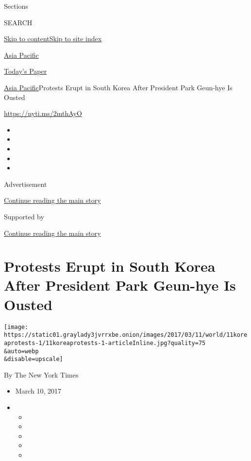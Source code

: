 Sections

SEARCH

\protect\hyperlink{site-content}{Skip to
content}\protect\hyperlink{site-index}{Skip to site index}

\href{https://www.nytimes3xbfgragh.onion/section/world/asia}{Asia
Pacific}

\href{https://myaccount.nytimes3xbfgragh.onion/auth/login?response_type=cookie\&client_id=vi}{}

\href{https://www.nytimes3xbfgragh.onion/section/todayspaper}{Today's
Paper}

\href{/section/world/asia}{Asia Pacific}\textbar{}Protests Erupt in
South Korea After President Park Geun-hye Is Ousted

\url{https://nyti.ms/2mthAyO}

\begin{itemize}
\item
\item
\item
\item
\item
\end{itemize}

Advertisement

\protect\hyperlink{after-top}{Continue reading the main story}

Supported by

\protect\hyperlink{after-sponsor}{Continue reading the main story}

\hypertarget{protests-erupt-in-south-korea-after-president-park-geun-hye-is-ousted}{%
\section{Protests Erupt in South Korea After President Park Geun-hye Is
Ousted}\label{protests-erupt-in-south-korea-after-president-park-geun-hye-is-ousted}}

\texttt{[image: https://static01.graylady3jvrrxbe.onion/images/2017/03/11/world/11koreaprotests-1/11koreaprotests-1-articleInline.jpg?quality=75\\\&auto=webp\\\&disable=upscale]}

By The New York Times

\begin{itemize}
\item
  March 10, 2017
\item
  \begin{itemize}
  \item
  \item
  \item
  \item
  \item
  \end{itemize}
\end{itemize}

